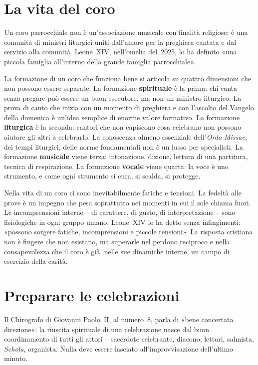 \documentclass[12pt,a4paper]{article}
\begin{document}
	\section{La vita del coro}
	
	Un coro parrocchiale non è un'associazione musicale con finalità religiose: è
	una comunità di ministri liturgici uniti dall'amore per la preghiera cantata e
	dal servizio alla comunità. Leone~XIV, nell'omelia del~2025, lo ha definito «una
	piccola famiglia all'interno della grande famiglia parrocchiale».
	
	La formazione di un coro che funziona bene si articola su quattro dimensioni
	che non possono essere separate. La formazione \textbf{spirituale} è la prima:
	chi canta senza pregare può essere un buon esecutore, ma non un ministro
	liturgico. La prova di canto che inizia con un momento di preghiera e con
	l'ascolto del Vangelo della domenica è un'idea semplice di enorme valore
	formativo. La formazione \textbf{liturgica} è la seconda: cantori che non
	capiscono cosa celebrano non possono aiutare gli altri a celebrarlo. La
	conoscenza almeno essenziale dell'\emph{Ordo Missae}, dei tempi liturgici, delle
	norme fondamentali non è un lusso per specialisti. La formazione
	\textbf{musicale} viene terza: intonazione, dizione, lettura di una partitura,
	tecnica di respirazione. La formazione \textbf{vocale} viene quarta: la voce è
	uno strumento, e come ogni strumento si cura, si scalda, si protegge.
	
	Nella vita di un coro ci sono inevitabilmente fatiche e tensioni. La fedeltà
	alle prove è un impegno che pesa soprattutto nei momenti in cui il sole chiama
	fuori. Le incomprensioni interne -- di carattere, di gusto, di interpretazione
	-- sono fisiologiche in ogni gruppo umano. Leone~XIV lo ha detto senza
	infingimenti: «possono sorgere fatiche, incomprensioni e piccole tensioni». La
	risposta cristiana non è fingere che non esistano, ma superarle nel perdono
	reciproco e nella consapevolezza che il coro è già, nelle sue dinamiche interne,
	un campo di esercizio della carità.
	
	\section{Preparare le celebrazioni}
	
	Il Chirografo di Giovanni Paolo~II, al numero~8, parla di «bene concertata
	direzione»: la riuscita spirituale di una celebrazione nasce dal buon
	coordinamento di tutti gli attori -- sacerdote celebrante, diacono, lettori,
	salmista, \emph{Schola}, organista. Nulla deve essere lasciato all'improvvisazione
	dell'ultimo minuto.
	
\end{document}
